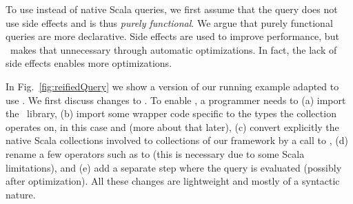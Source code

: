 To use {\LoS} instead of native Scala queries, we first assume that the query
does not use side effects and is thus \emph{purely functional}. We argue that purely functional queries are more
declarative. Side effects are used to improve performance, but
\LoS\ makes that unnecessary through automatic optimizations. In fact, the lack
of side effects enables more optimizations.


In Fig.~\ref{fig:reifiedQuery} we show a version of our running example adapted to use {\LoS}. We first discuss changes to .
To enable {\LoS}, a programmer needs to (a) import the \LoS\
library, (b) import some wrapper code specific to the types the collection
operates on, in this case \code{Book} and \code{Author} (more about that later), (c) convert explicitly the native Scala collections involved to collections of our framework by a call to , (d) rename a few operators such as \code{==} to \code{==#} (this is necessary due to some Scala limitations), and (e) add a separate step where the query is evaluated (possibly after optimization). All these changes are lightweight and mostly of a  syntactic nature.



